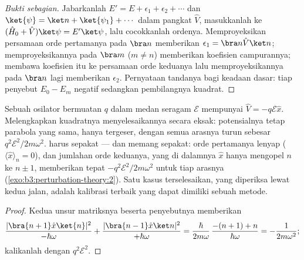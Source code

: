 \begin{proof}[Bukti sebagian]
Jabarkanlah $E' = E + \epsilon_1 + \epsilon_2 + \cdots$ dan $\ket{\psi} =
\ket n + \ket{\psi_1} + \cdots$ dalam pangkat $\hat V$, masukkanlah ke
$(\hat H_0 + \hat V)\ket\psi = E'\ket\psi$, lalu cocokkanlah ordenya.
Memproyeksikan persamaan orde pertamanya pada $\bra n$ memberikan $\epsilon_1 =
\bra n\hat V\ket n$; memproyeksikannya pada $\bra m$
($m \neq n$) memberikan koefisien campurannya; membawa koefisien itu ke
persamaan orde keduanya lalu memproyeksikannya pada $\bra n$ lagi
memberikan $\epsilon_2$. Pernyataan tandanya bagi keadaan dasar: tiap
penyebut $E_0 - E_m$ negatif sedangkan pembilangnya kuadrat.
\end{proof}

\begin{proposition}\label{prop:b3:perturbation-theory:oscillator-field}
Sebuah osilator bermuatan $q$ dalam medan seragam $\mathcal E$
mempunyai $\hat V = -q\mathcal E\hat x$. Melengkapkan kuadratnya
menyelesaikannya secara eksak: potensialnya tetap parabola yang sama,
hanya tergeser, dengan semua arasnya turun sebesar
$q^2\mathcal E^2/2m\omega^2$.  harus sepakat --- dan
memang sepakat: orde pertamanya lenyap ($\langle\hat
x\rangle_n = 0$), dan jumlahan orde keduanya, yang di dalamnya $\hat x$
hanya mengopel $n$ ke $n \pm 1$, memberikan tepat
$-q^2\mathcal E^2/2m\omega^2$ untuk tiap arasnya
(\cref{exo:b3:perturbation-theory:2}). Satu kasus terselesaikan, yang
diperiksa lewat kedua jalan, adalah kalibrasi terbaik yang dapat
dimiliki sebuah metode.
\end{proposition}

\begin{proof}
Kedua unsur matriksnya beserta penyebutnya memberikan
\[
\frac{|\bra{n+1}\hat x\ket{n}|^2}{-\hbar\omega}
 + \frac{|\bra{n-1}\hat x\ket n|^2}{+\hbar\omega}
 = \frac{\hbar}{2m\omega}\,\frac{-(n+1) + n}{\hbar\omega}
 = -\frac{1}{2m\omega^2} ;
\]
kalikanlah dengan $q^2\mathcal E^2$.
\end{proof}

